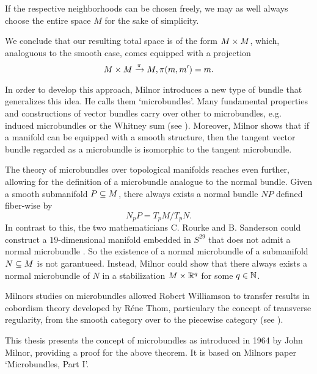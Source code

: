 \begin{myparagraph}
    If the respective neighborhoods can be chosen freely,
    we may as well always choose the entire space $M$ for the sake of simplicity.

    We conclude that our resulting total space is of the form $M \times M$, which,
    analoguous to the smooth case, comes equipped with a projection
    \[ M \times M \xrightarrow{\pi} M, \pi(m, m') = m. \]
    
    In order to develop this approach, Milnor introduces a new type of bundle
    that generalizes this idea.
    He calls them `microbundles'.
    Many fundamental properties
    and constructions of vector bundles carry over other to microbundles,
    e.g. induced microbundles or the Whitney sum (see ).
    Moreover, Milnor shows that if a manifold can be equipped with a smooth structure,
    then the tangent vector bundle regarded as a microbundle is isomorphic to the
    tangent microbundle.

    The theory of microbundles over topological manifolds reaches even further,
    allowing for the definition of a microbundle analogue
    to the normal bundle.
    Given a smooth submanifold $P \subseteq{} M$,
    there always exists a normal bundle $NP$ defined fiber-wise by
    \[ N_p P = T_p M / T_p N. \]
    In contrast to this, the two mathematicians C. Rourke and B. Sanderson could construct a $19$-dimensional manifold
    embedded in $S^{29}$ that does not admit a normal microbundle \cite{rourke}.
    So the existence of a normal microbundle of a submanifold $N \subseteq{} M$ is not garantueed.
    Instead, Milnor could show that there always exists a normal microbundle
    of $N$ in a stabilization $M \times \mathbb{R}^q$ for some $q \in \mathbb{N}$.

    Milnors studies on microbundles allowed Robert Williamson
    to transfer results in cobordism theory developed by Réne Thom,
    particulary the concept of transverse regularity, from the smooth category
    over to the piecewise category (see \cite{williamson}).

    This thesis presents the concept of microbundles as introduced in 1964 by John Milnor,
    providing a proof for the above theorem.
    It is based on Milnors paper `Microbundles, Part I'.
\end{myparagraph}